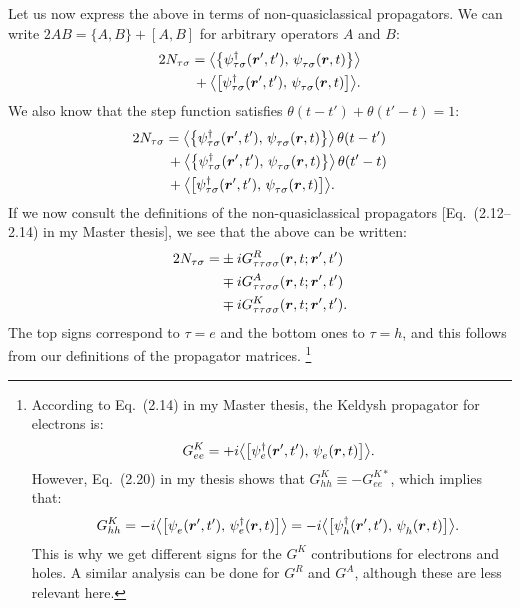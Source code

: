 Let us now express the above in terms of non-quasiclassical propagators.
We can write $2AB = \{A, B\} + [A, B]$ for arbitrary operators $A$ and $B$:
\begin{equation}
\begin{aligned}
  2N_{\tau\sigma}
  &=   \big\langle \big\{ \psi_{\tau\sigma}^\dagger(\bm{r}',t'),\, \psi_{\tau\sigma}^{\phantom{\dagger}}(\bm{r},t) \big\} \big\rangle \\
  &\,+ \big\langle \big[  \psi_{\tau\sigma}^\dagger(\bm{r}',t'),\, \psi_{\tau\sigma}^{\phantom{\dagger}}(\bm{r},t) \big]  \big\rangle. 
\end{aligned}
\end{equation}
We also know that the step function satisfies $\theta(t-t') + \theta(t'-t) = 1$:
\begin{equation}
\begin{aligned}
  2N_{\tau\sigma}
  &=   \big\langle \big\{ \psi_{\tau\sigma}^\dagger(\bm{r}',t'),\, \psi_{\tau\sigma}^{\phantom{\dagger}}(\bm{r},t) \big\} \big\rangle \,\theta(t-t') \\
  &\,+ \big\langle \big\{ \psi_{\tau\sigma}^\dagger(\bm{r}',t'),\, \psi_{\tau\sigma}^{\phantom{\dagger}}(\bm{r},t) \big\} \big\rangle \,\theta(t'-t) \\
  &\,+ \big\langle \big[  \psi_{\tau\sigma}^\dagger(\bm{r}',t'),\, \psi_{\tau\sigma}^{\phantom{\dagger}}(\bm{r},t) \big]  \big\rangle. 
\end{aligned}
\end{equation}
If we now consult the definitions of the non-quasiclassical propagators [Eq.~(2.12--2.14) in my Master thesis], we see that the above can be written:
\begin{equation}
\begin{aligned}
  2N_{\tau\sigma}
   =& \pm i G^R_{\tau\tau\sigma\sigma}(\bm{r}, t; \bm{r}', t') \\
    & \mp i G^A_{\tau\tau\sigma\sigma}(\bm{r}, t; \bm{r}', t') \\
    & \mp i G^K_{\tau\tau\sigma\sigma}(\bm{r}, t; \bm{r}', t') .
\end{aligned}
\end{equation}
The top signs correspond to $\tau = e$ and the bottom ones to $\tau = h$, and this follows from our definitions of the propagator matrices.%
\footnote{According to Eq.~(2.14) in my Master thesis, the Keldysh propagator for electrons is:
  \begin{equation} \quad G^K_{ee} = +i\big\langle \big[\psi_e^{\dagger}(\B{r}',t'),\,\psi_e^{\phantom\dagger}(\B{r},t) \big] \big\rangle. \end{equation}
  However, Eq.~(2.20) in my thesis shows that $G^K_{hh} \equiv -G^{K\ast}_{ee}$, which implies that:
  \begin{equation} \quad G^K_{hh} = -i\big\langle \big[\psi_e^{\phantom\dagger}(\B{r}',t'),\,\psi_e^{\dagger}(\B{r},t) \big] \big\rangle = -i\big\langle \big[\psi_h^{\dagger}(\B{r}',t'),\,\psi_h^{\phantom\dagger}(\B{r},t) \big] \big\rangle. \end{equation}
  This is why we get different signs for the $G^K$ contributions for electrons and holes. 
  A similar analysis can be done for $G^R$ and $G^A$, although these are less relevant here.}
